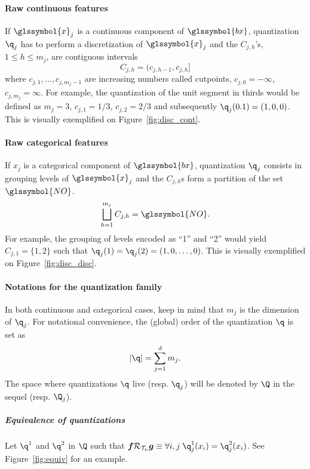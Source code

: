 \paragraph{Raw continuous features} If $\glssymbol{x}_j$ is a continuous component of $\glssymbol{bx}$, quantization $\q_j$ has to perform a discretization of $\glssymbol{x}_j$ and the $C_{j,h}$'s, $1\le h\le m_j$, are contiguous intervals  
\begin{equation}\label{eq:Cjhcont}
C_{j,h}=(c_{j,h-1},c_{j,h}]
\end{equation}
where $c_{j,1},\ldots,c_{j,m_j-1}$ are increasing numbers called cutpoints, $c_{j,0}=-\infty$, $c_{j,m_j}=\infty$. For example, the quantization of the unit segment in thirds would be defined as $m_j=3$, $c_{j,1} = 1/3$, $c_{j,2} = 2/3$ and subsequently $\q_j(0.1) = (1,0,0)$. This is visually exemplified on Figure~\ref{fig:disc_cont}.
\paragraph{Raw categorical features} If $x_j$ is a categorical component of $\glssymbol{bx}$, quantization $\q_j$ consists in grouping levels of $\glssymbol{x}_j$ and the $C_{j,h}$s form a partition of the set $\glssymbol{NO}$.
\begin{equation*}
\bigsqcup_{h=1}^{m_j}C_{j,h}=\glssymbol{NO}.
\end{equation*}
For example, the grouping of levels encoded as ``1'' and ``2'' would yield $C_{j,1} = \{1,2\}$ such that $\q_j(1) = \q_j(2) = (1,0,\ldots,0)$. This is visually exemplified on Figure~\ref{fig:disc_disc}.

\paragraph{Notations for the quantization family}

In both continuous and categorical cases, keep in mind that $m_j$ is the dimension of $\q_j$. For notational convenience, the (global) order of the quantization $\q$ is set as 
\[|\q|=\sum_{j=1}^d m_j.\]
The space where quantizations $\q$ live (resp. $\q_j$) will be denoted by $\Q$ in the sequel (resp. $\Q_j$).

\subparagraph{Equivalence of quantizations} \label{par:equiv}

Let $\q^1$ and $\q^2$ in $\Q$ such that $\boldsymbol{f} \mathcal{R}_{\mathcal{T}_n} \boldsymbol{g} \equiv \forall i,j \; \q^1_j(x_i) = \q^2_j(x_i)$. See Figure~\ref{fig:equiv} for an example.

